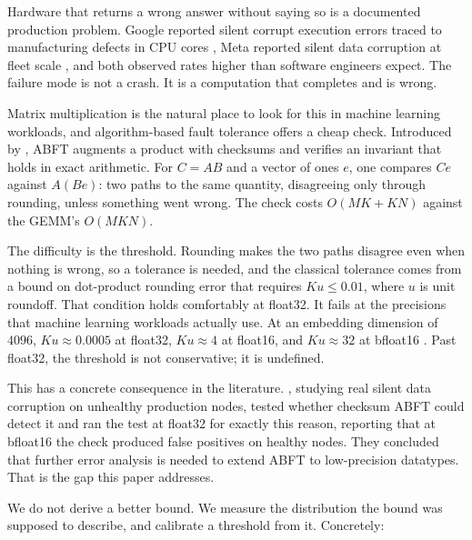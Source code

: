 \documentclass[11pt]{article}
\begin{document}
Hardware that returns a wrong answer without saying so is a documented
production problem. Google reported silent corrupt execution errors traced to
manufacturing defects in CPU cores \citep{hochschild2021cores}, Meta reported
silent data corruption at fleet scale \citep{dixit2021silent}, and both
observed rates higher than software engineers expect. The failure mode is not a
crash. It is a computation that completes and is wrong.

Matrix multiplication is the natural place to look for this in machine learning
workloads, and algorithm-based fault tolerance offers a cheap check. Introduced
by \citet{huang1984abft}, ABFT augments a product with checksums and verifies
an invariant that holds in exact arithmetic. For $C = AB$ and a vector of ones
$e$, one compares $Ce$ against $A(Be)$: two paths to the same quantity,
disagreeing only through rounding, unless something went wrong. The check costs
$O(MK + KN)$ against the GEMM's $O(MKN)$.

The difficulty is the threshold. Rounding makes the two paths disagree even
when nothing is wrong, so a tolerance is needed, and the classical tolerance
comes from a bound on dot-product rounding error that requires $Ku \leq 0.01$,
where $u$ is unit roundoff. That condition holds comfortably at float32. It
fails at the precisions that machine learning workloads actually use. At an
embedding dimension of $4096$, $Ku \approx 0.0005$ at float32,
$Ku \approx 4$ at float16, and $Ku \approx 32$ at bfloat16
\citep{ma2025understanding}. Past float32, the threshold is not conservative;
it is undefined.

This has a concrete consequence in the literature. \citet{ma2025understanding},
studying real silent data corruption on unhealthy production nodes, tested
whether checksum ABFT could detect it and ran the test at float32 for exactly
this reason, reporting that at bfloat16 the check produced false positives on
healthy nodes. They concluded that further error analysis is needed to extend
ABFT to low-precision datatypes. That is the gap this paper addresses.

We do not derive a better bound. We measure the distribution the bound was
supposed to describe, and calibrate a threshold from it. Concretely:
\end{document}

